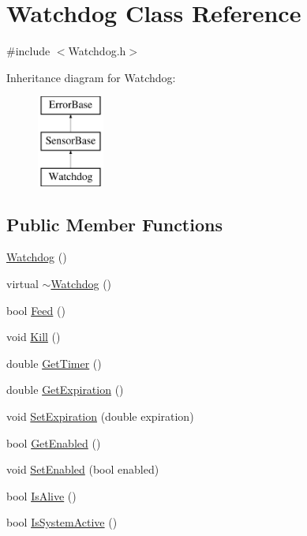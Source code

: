 \hypertarget{classWatchdog}{
\section{Watchdog Class Reference}
\label{classWatchdog}
}


{\ttfamily \#include $<$Watchdog.h$>$}

Inheritance diagram for Watchdog:\begin{figure}[H]
\begin{center}
\leavevmode
\includegraphics[height=3.000000cm]{classWatchdog}
\end{center}
\end{figure}
\subsection*{Public Member Functions}
\begin{DoxyCompactItemize}
\item 
\hyperlink{classWatchdog_ab4aa2c62f897880ca29fd64062ab0e04}{Watchdog} ()
\item 
virtual \hyperlink{classWatchdog_ad836a36b5eb5dbe134d4050d49a95d4e}{$\sim$Watchdog} ()
\item 
bool \hyperlink{classWatchdog_a3cc002218451cef522323e31a47942fc}{Feed} ()
\item 
void \hyperlink{classWatchdog_a745909868621524196285fbafd19957a}{Kill} ()
\item 
double \hyperlink{classWatchdog_a1e9c281b0493b204846637c28a91ff2d}{GetTimer} ()
\item 
double \hyperlink{classWatchdog_a9bdab36844738068fab551d00f61825a}{GetExpiration} ()
\item 
void \hyperlink{classWatchdog_a9c38cdfcd21f1b66e4f19793c3116f63}{SetExpiration} (double expiration)
\item 
bool \hyperlink{classWatchdog_a3e909838aafb749f637323f06afc628c}{GetEnabled} ()
\item 
void \hyperlink{classWatchdog_a7b7f75dc69e94b17f62e57b915f3871a}{SetEnabled} (bool enabled)
\item 
bool \hyperlink{classWatchdog_aa985d8ec5ea4d0ab87d61180f74531d4}{IsAlive} ()
\item 
bool \hyperlink{classWatchdog_a5954d95dd512c007945c4d9061ef70ae}{IsSystemActive} ()
\end{DoxyCompactItemize}
